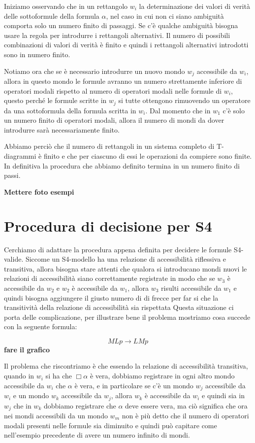 \documentclass[a4paper, titlepage, 12pt]{report}
\begin{document}
Iniziamo osservando che in un rettangolo $w_i$
la determinazione dei valori di verità delle sottoformule della formula $\alpha$,
nel caso in cui non ci siano ambiguità comporta solo un numero finito di passaggi.
Se c'è qualche ambiguità bisogna usare la regola per introdurre i rettangoli alternativi.
Il numero di possibili combinazioni di valori di verità è finito e quindi
i rettangoli alternativi introdotti sono in numero finito.

Notiamo ora che se è necessario introdurre un nuovo mondo $w_j$ accessibile da $w_i$,
allora in questo mondo le formule avranno un numero strettamente inferiore di operatori
modali rispetto al numero di operatori modali nelle formule di $w_i$, questo perché
le formule scritte in $w_j$ si tutte ottengono rimuovendo un operatore da una sottoformula
della formula scritta in $w_i$.
Dal momento che in $w_1$ c'è solo un numero finito di operatori
modali, allora il numero di mondi da dover introdurre sarà necessariamente finito.

Abbiamo perciò che il numero di rettangoli in un sistema completo di T-diagrammi è finito
e che per ciascuno di essi le operazioni da compiere sono finite. In definitiva
la procedura che abbiamo definito termina in un numero finito di passi.

\textbf{Mettere foto esempi}


\section{Procedura di decisione per S4}
Cerchiamo di adattare la procedura appena definita per decidere le formule S4-valide.
Siccome un S4-modello ha una relazione di accessibilità riflessiva e transitiva, allora bisogna stare
attenti che qualora si introducano mondi nuovi le relazioni di accessibilità siano
correttamente registrate in modo che se $w_3$ è accessibile da $w_2$ e $w_2$ è accessibile
da $w_1$, allora $w_3$ risulti accessibile da $w_1$ e quindi bisogna aggiungere il giusto
numero di di frecce per far si che la transitività della relazione di accessibilità sia rispettata
Questa situazione ci porta delle complicazione, per illustrare bene il problema
mostriamo cosa succede con la seguente formula:

$$MLp \rightarrow LMp$$
\textbf{fare il grafico}

Il problema che riscontriamo è che essendo la relazione di accessibilità transitiva,
quando in $w_i$ si ha che $\Box \alpha$ è vera, dobbiamo registrare in ogni altro mondo
accessibile da $w_i$ che $\alpha$ è vera, e in particolare se c'è un mondo $w_j$
accessibile da $w_i$ e un mondo $w_k$ accessibile da $w_j$, allora $w_k$ è accessibile
da $w_i$ e quindi sia in $w_j$ che in $w_k$ dobbiamo registrare che $\alpha$ deve essere vera,
ma ciò significa che ora nei mondi accessibili da un mondo $w_m$ non è più detto
che il numero di operatori modali presenti nelle formule sia diminuito e quindi
può capitare come nell'esempio precedente di avere un numero infinito di mondi.
\end{document}
